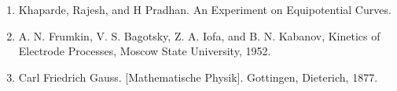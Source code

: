 \documentclass{article}
\begin{document}
  
  
\begin{enumerate}
\item Khaparde, Rajesh, and H Pradhan. An Experiment on Equipotential Curves.
\item A. N. Frumkin, V. S. Bagotsky, Z. A. Iofa, and B. N. Kabanov, Kinetics of Electrode Processes, Moscow State University, 1952.
\item Carl Friedrich Gauss. [Mathematische Physik]. Gottingen, Dieterich, 1877.

\end{enumerate}
\end{document}
